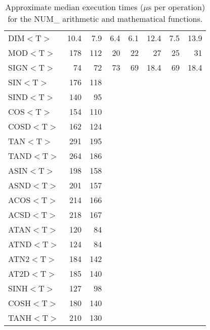 \documentclass[11pt,nolof]{starlink}
\providecommand{\name}[1]{\mbox{#1}}
\begin{document}
\begin{table}[h]
\begin{center}
\begin{footnotesize}
\begin{tabular}{|l|r|r|r|r|r|r|r|}
DIM$<$T$>$ & 10.4 &  7.9 &  6.4 &  6.1 & 12.4 &  7.5 & 13.9 \\
MOD$<$T$>$ &  178 &  112 &   20 &   22 &   27 &   25 &   31 \\
SIGN$<$T$>$ &   74 &   72 &   73 &   69 & 18.4 &   69 & 18.4 \\
SIN$<$T$>$ &  176 &  118 &      &      &      &      &      \\
SIND$<$T$>$ &  140 &   95 &      &      &      &      &      \\
COS$<$T$>$ &  154 &  110 &      &      &      &      &      \\
COSD$<$T$>$ &  162 &  124 &      &      &      &      &      \\
TAN$<$T$>$ &  291 &  195 &      &      &      &      &      \\
TAND$<$T$>$ &  264 &  186 &      &      &      &      &      \\
ASIN$<$T$>$ &  198 &  158 &      &      &      &      &      \\
ASND$<$T$>$ &  201 &  157 &      &      &      &      &      \\
ACOS$<$T$>$ &  214 &  166 &      &      &      &      &      \\
ACSD$<$T$>$ &  218 &  167 &      &      &      &      &      \\
ATAN$<$T$>$ &  120 &   84 &      &      &      &      &      \\
ATND$<$T$>$ &  124 &   84 &      &      &      &      &      \\
ATN2$<$T$>$ &  184 &  142 &      &      &      &      &      \\
AT2D$<$T$>$ &  185 &  140 &      &      &      &      &      \\
SINH$<$T$>$ &  127 &   98 &      &      &      &      &      \\
COSH$<$T$>$ &  180 &  140 &      &      &      &      &      \\
TANH$<$T$>$ &  210 &  130 &      &      &      &      &      \\
\hline
\end{tabular}
\end{footnotesize}
\caption{Approximate median execution times ($\mu$s per operation) for the
\name{NUM\_} arithmetic and mathematical functions.}
\label{table:numstats}
\end{center}
\end{table}

\newpage
\end{document}
